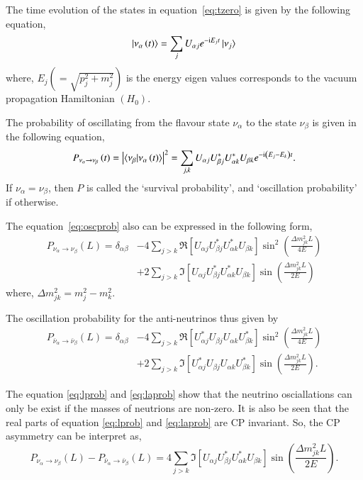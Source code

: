 The time evolution of the states in equation~\ref{eq:tzero} is given by the following equation,
\begin{equation}
  \ket{\nu_{\alpha}\left(t\right)}=\sum_{j}U_{\alpha j}e^{-\mathrm{i}E_{j}t}\ket{\nu_{j}} \label{eq:ttime}
\end{equation}
where, $E_{j}\left(=\sqrt{p_{j}^{2}+m_{j}^{2}}\right)$ is the energy eigen values corresponds to the vacuum propagation Hamiltonian $\left(H_0\right)$.

The probability of oscillating from the flavour state $\nu_\alpha$ to the state $\nu_\beta$ is given in the following equation,
\begin{equation}
  P_{\nu_\alpha\rightarrow\nu_\beta}\left(t\right) = \left|\braket{\nu_\beta|\nu_\alpha\left(t\right)}\right|^2 = \sum_{j,k}U_{\alpha j}U^{*}_{\beta j}U^{*}_{\alpha k}U_{\beta k}e^{-\mathrm{i}\left(E_{j}-E_{k}\right)t}.
  \label{eq:oscprob}
\end{equation}
If $\nu_\alpha=\nu_\beta$, then $P$ is called the `survival probability', and `oscillation probability' if otherwise.

The equation~\ref{eq:oscprob} also can be expressed in the following form,
\begin{align}
  P_{\nu_\alpha\rightarrow\nu_\beta}\left(L\right) = \delta_{\alpha\beta} & -4\sum_{j>k}\Re\left[U_{\alpha j}U^{*}_{\beta j}U^{*}_{\alpha k}U_{\beta k}\right]\sin^2\left(\frac{\Delta m^2_{jk}L}{4E}\right) \nonumber\\
  & +2\sum_{j>k}\Im\left[U_{\alpha j}U^{*}_{\beta j}U^{*}_{\alpha k}U_{\beta k}\right]\sin\left(\frac{\Delta m^2_{jk}L}{2E}\right)
  \label{eq:lprob}
\end{align}
where, $\Delta m^2_{jk}=m^2_{j}-m^2_{k}$.

The oscillation probability for the anti-neutrinos thus given by
\begin{align}
  P_{\bar{\nu}_\alpha\rightarrow\bar{\nu}_\beta}\left(L\right) = \delta_{\alpha\beta} & -4\sum_{j>k}\Re\left[U^{*}_{\alpha j}U_{\beta j}U_{\alpha k}U^{*}_{\beta k}\right]\sin^2\left(\frac{\Delta m^2_{jk}L}{4E}\right) \nonumber\\
  & +2\sum_{j>k}\Im\left[U^{*}_{\alpha j}U_{\beta j}U_{\alpha k}U^{*}_{\beta k}\right]\sin\left(\frac{\Delta m^2_{jk}L}{2E}\right).
  \label{eq:laprob}
\end{align}

The equation \ref{eq:lprob} and \ref{eq:laprob} show that the neutrino osciallations can only be exist if the masses of neutrions are non-zero. It is also be seen that the real parts of equation \ref{eq:lprob} and \ref{eq:laprob} are CP invariant. So, the CP asymmetry can be interpret as,
\begin{equation}  P_{\nu_\alpha\rightarrow\nu_\beta}\left(L\right)-P_{\bar{\nu}_\alpha\rightarrow\bar{\nu}_\beta}\left(L\right) = 4\sum_{j>k}\Im\left[U_{\alpha j}U^{*}_{\beta j}U^{*}_{\alpha k}U_{\beta k}\right]\sin\left(\frac{\Delta m^2_{jk}L}{2E}\right).
  \label{eq:cpass}
\end{equation}

